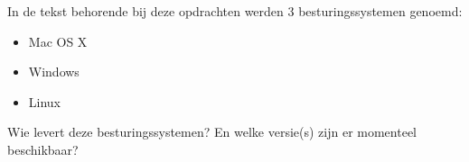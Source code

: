 In de tekst behorende bij deze opdrachten werden 3 besturingssystemen genoemd:
\begin{itemize}
\item Mac OS X
\item Windows
\item Linux
\end{itemize}

Wie levert deze besturingssystemen? En welke versie(s) zijn er momenteel beschikbaar?

